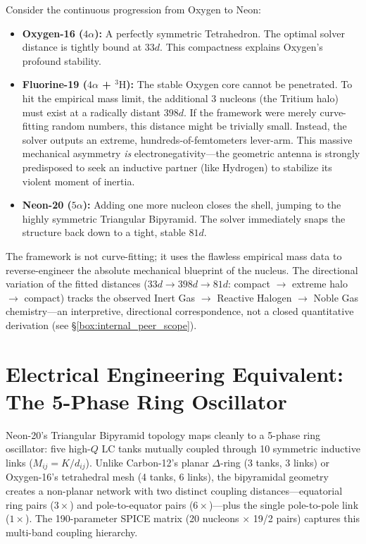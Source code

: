 Consider the continuous progression from Oxygen to Neon:
\begin{itemize}
    \item \textbf{Oxygen-16 ($4\alpha$):} A perfectly symmetric Tetrahedron. The optimal solver distance is tightly bound at \textbf{$33d$}. This compactness explains Oxygen's profound stability.
    \item \textbf{Fluorine-19 ($4\alpha$ + $^3\text{H}$):} The stable Oxygen core cannot be penetrated. To hit the empirical mass limit, the additional 3 nucleons (the Tritium halo) must exist at a radically distant \textbf{$398d$}. If the framework were merely curve-fitting random numbers, this distance might be trivially small. Instead, the solver outputs an extreme, hundreds-of-femtometers lever-arm. This massive mechanical asymmetry \textit{is} electronegativity—the geometric antenna is strongly predisposed to seek an inductive partner (like Hydrogen) to stabilize its violent moment of inertia. 
    \item \textbf{Neon-20 ($5\alpha$):} Adding one more nucleon closes the shell, jumping to the highly symmetric Triangular Bipyramid. The solver immediately snaps the structure back down to a tight, stable \textbf{$81d$}. 
\end{itemize}

The framework is not curve-fitting; it uses the flawless empirical mass data to reverse-engineer the absolute mechanical blueprint of the nucleus. The directional variation of the fitted distances ($33d \rightarrow 398d \rightarrow 81d$: compact $\rightarrow$ extreme halo $\rightarrow$ compact) tracks the observed Inert Gas $\rightarrow$ Reactive Halogen $\rightarrow$ Noble Gas chemistry---an interpretive, directional correspondence, not a closed quantitative derivation (see \S\ref{box:internal_peer_scope}).

\section{Electrical Engineering Equivalent: The 5-Phase Ring Oscillator}
Neon-20's Triangular Bipyramid topology maps cleanly to a 5-phase ring oscillator: five high-$Q$ LC tanks mutually coupled through 10 symmetric inductive links ($M_{ij} = K/d_{ij}$). Unlike Carbon-12's planar $\Delta$-ring (3 tanks, 3 links) or Oxygen-16's tetrahedral mesh (4 tanks, 6 links), the bipyramidal geometry creates a non-planar network with two distinct coupling distances---equatorial ring pairs ($3\times$) and pole-to-equator pairs ($6\times$)---plus the single pole-to-pole link ($1\times$). The 190-parameter SPICE matrix (20 nucleons $\times$ 19/2 pairs) captures this multi-band coupling hierarchy.

